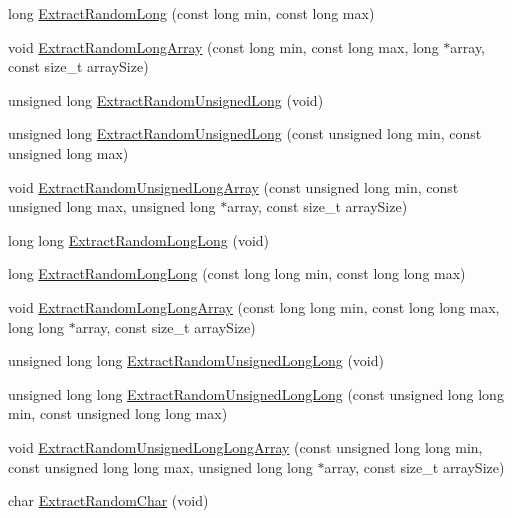 \begin{DoxyCompactItemize}
\item 
long \hyperlink{classcmn_random_sequence_a7e77852354b662c2ab447179436931b3}{Extract\+Random\+Long} (const long min, const long max)
\item 
void \hyperlink{classcmn_random_sequence_a28b8ca1999b28f1e1a597810ab8e2f23}{Extract\+Random\+Long\+Array} (const long min, const long max, long $\ast$array, const size\+\_\+t array\+Size)
\item 
unsigned long \hyperlink{classcmn_random_sequence_a349e323a2b5a2445ee47949ae1babd1b}{Extract\+Random\+Unsigned\+Long} (void)
\item 
unsigned long \hyperlink{classcmn_random_sequence_a89fd0c4f12a12106261abb7b604fe02b}{Extract\+Random\+Unsigned\+Long} (const unsigned long min, const unsigned long max)
\item 
void \hyperlink{classcmn_random_sequence_aa3e7fa83b4fdde64d7691bb48035c5a8}{Extract\+Random\+Unsigned\+Long\+Array} (const unsigned long min, const unsigned long max, unsigned long $\ast$array, const size\+\_\+t array\+Size)
\item 
long long \hyperlink{classcmn_random_sequence_a4ffccb12c2b0eacf39fb3f0ff33b2db3}{Extract\+Random\+Long\+Long} (void)
\item 
long \hyperlink{classcmn_random_sequence_a885fb0654f9afe0cf199d85c7748ebe0}{Extract\+Random\+Long\+Long} (const long long min, const long long max)
\item 
void \hyperlink{classcmn_random_sequence_a7f1f2984aef4b94a0a3b467dcb8a712d}{Extract\+Random\+Long\+Long\+Array} (const long long min, const long long max, long long $\ast$array, const size\+\_\+t array\+Size)
\item 
unsigned long long \hyperlink{classcmn_random_sequence_ae095c21b6b0656e27d046affc676da19}{Extract\+Random\+Unsigned\+Long\+Long} (void)
\item 
unsigned long long \hyperlink{classcmn_random_sequence_a97b91a8dacaaebd099d635676f61f147}{Extract\+Random\+Unsigned\+Long\+Long} (const unsigned long long min, const unsigned long long max)
\item 
void \hyperlink{classcmn_random_sequence_a27020e01052b3a11265f6861a4492a12}{Extract\+Random\+Unsigned\+Long\+Long\+Array} (const unsigned long long min, const unsigned long long max, unsigned long long $\ast$array, const size\+\_\+t array\+Size)
\item 
char \hyperlink{classcmn_random_sequence_ac6ef7c2be03d15eedbc42cb271226070}{Extract\+Random\+Char} (void)
\item 

\end{DoxyCompactItemize}
